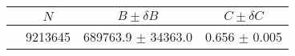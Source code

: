 \begin{tabular}{lccc}
\hline
    &   $N$   & $B \pm \delta B$  &  $C \pm \delta C$ \\
\hline
                               & 9213645    & 689763.9   $\pm$ 34363.0 & 0.656      $\pm$ 0.005 \\
\hline
\end{tabular}

